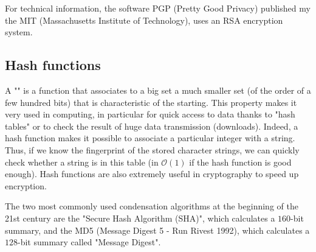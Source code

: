 	For technical information, the software PGP (Pretty Good Privacy) published my the MIT (Massachusetts Institute of Technology), uses an RSA encryption system.
	
	\pagebreak

	
	\pagebreak
	\subsection{Hash functions}
	A "" is a function that associates to a big set a much smaller set (of the order of a few hundred bits) that is characteristic of the starting. This property makes it very used in computing, in particular for quick access to data thanks to "hash tables" or to check the result of huge data transmission (downloads). Indeed, a hash function makes it possible to associate a particular integer with a string. Thus, if we know the fingerprint of the stored character strings, we can quickly check whether a string is in this table (in $\mathcal{O}(1)$ if the hash function is good enough). Hash functions are also extremely useful in cryptography to speed up encryption.

	The two most commonly used condensation algorithms at the beginning of the 21st century are the "Secure Hash Algorithm (SHA)", which calculates a $160$-bit summary, and the MD5 (Message Digest 5 - Run Rivest 1992), which calculates a $128$-bit summary called "Message Digest".
	

